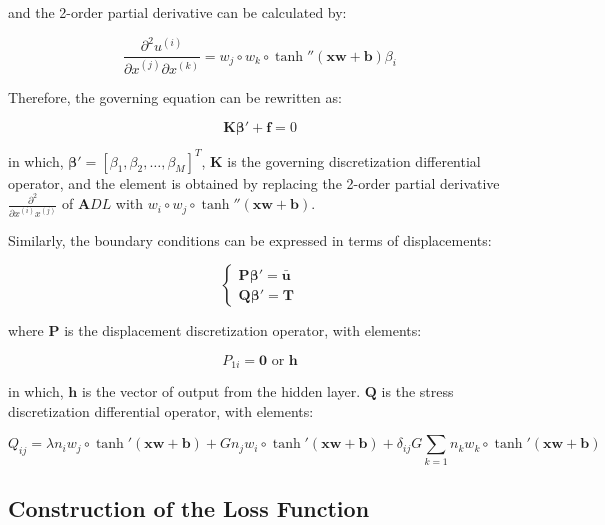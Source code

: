 \documentclass[11pt]{article}
\begin{document}
and the 2-order partial derivative can be calculated by:

\begin{equation}
\frac{\partial^2 u^{(i)}}{\partial x^{(j)}\partial x^{(k)}} = w_j \circ w_k \circ \tanh''(\mathbf{x}\mathbf{w} + \mathbf{b})\beta_i
\end{equation}

Therefore, the governing equation can be rewritten as:

\begin{equation}
\mathbf{K}\boldsymbol{\beta}' + \mathbf{f} = 0
\end{equation}

in which, $\boldsymbol{\beta}' = [\beta_1, \beta_2, \ldots, \beta_M]^T$, $\mathbf{K}$ is the governing discretization differential operator, and the element is obtained by replacing the 2-order partial derivative $\frac{\partial^2}{\partial x^{(i)}x^{(j)}}$ of $\mathbf{A}DL$ with $w_i \circ w_j \circ \tanh''(\mathbf{x}\mathbf{w} + \mathbf{b})$.

Similarly, the boundary conditions can be expressed in terms of displacements:

\begin{equation}
\begin{cases}
\mathbf{P}\boldsymbol{\beta}' = \bar{\mathbf{u}} \\
\mathbf{Q}\boldsymbol{\beta}' = \mathbf{T}
\end{cases}
\end{equation}

where $\mathbf{P}$ is the displacement discretization operator, with elements:

\begin{equation}
P_{1i} = \mathbf{0} \text{ or } \mathbf{h}
\end{equation}

in which, $\mathbf{h}$ is the vector of output from the hidden layer. $\mathbf{Q}$ is the stress discretization differential operator, with elements:

\begin{equation}
Q_{ij} = \lambda n_i w_j \circ \tanh'(\mathbf{x}\mathbf{w} + \mathbf{b}) + G n_j w_i \circ \tanh'(\mathbf{x}\mathbf{w} + \mathbf{b}) + \delta_{ij}G\sum_{k=1}n_k w_k \circ \tanh'(\mathbf{x}\mathbf{w} + \mathbf{b})
\end{equation}

\subsection{Construction of the Loss Function}
\end{document}
